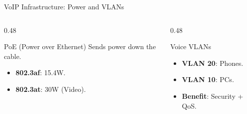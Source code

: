\documentclass[aspectratio=169]{beamer}  %
\begin{document}
\begin{frame}{VoIP Infrastructure: Power and VLANs}
    \begin{columns}[T]
        \begin{column}{0.48\textwidth}
            \begin{block}{PoE (Power over Ethernet)}
                \small
                Sends power down the cable.
                \begin{itemize}
                    \item \textbf{802.3af}: 15.4W.
                    \item \textbf{802.3at}: 30W (Video).
                \end{itemize}
            \end{block}
        \end{column}
        \begin{column}{0.48\textwidth}
            \begin{block}{Voice VLANs}
                \small
                \begin{itemize}
                    \item \textbf{VLAN 20}: Phones.
                    \item \textbf{VLAN 10}: PCs.
                    \item \textbf{Benefit}: Security + QoS.
                \end{itemize}
            \end{block}
        \end{column}
    \end{columns}
    \begin{center}
    \end{center}
\end{frame}
\end{document}
